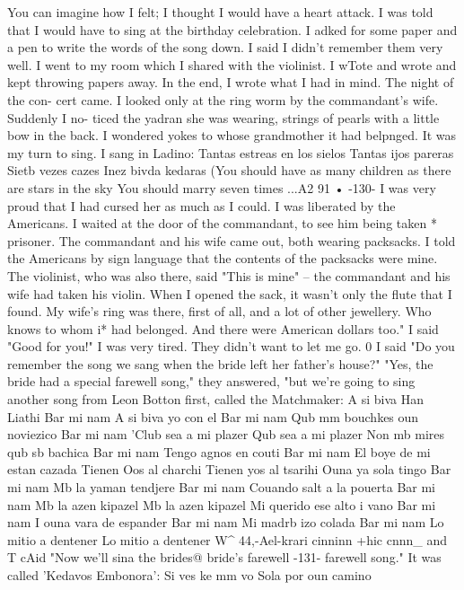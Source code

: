 You can imagine how I 
felt; I thought I would have a heart attack.
I was told that I would have to sing 
at the birthday celebration.
I adked for some paper and a pen to write the words of 
the song down.
I said I didn't remember them very well.
I went to my room which I shared with the violinist.
I wTote and wrote and kept 
throwing papers away.
In the end, I wrote what I had in mind.
The night of the con-
cert came.
I looked only at the ring worm by the commandant's wife.
Suddenly I no-
ticed the yadran she was wearing, strings of pearls with a little bow in the back.
I 
wondered yokes to whose grandmother it had belpnged.
It was my turn to sing.
I sang 
in Ladino: 
Tantas estreas en los sielos 
Tantas ijos pareras 
Sietb vezes cazes 
Inez bivda kedaras 
(You should have as many children 
as there are stars in the sky 
You should marry seven times 
...A2 91 • 
-130- 
I was very proud that I had cursed her as much as I could.
I was liberated by the Americans.
I waited at the door of the commandant, to 
see him being taken 
* 
prisoner.
The commandant and his wife came out, both wearing 
packsacks.
I told the Americans by sign language that the contents of the packsacks 
were mine.
The violinist, who was also there, said "This is mine" -- the commandant 
and his wife had taken his violin.
When I opened the sack, it wasn't only the flute 
that I found.
My wife's ring was there, first of all, and a lot of other jewellery.
Who knows to whom i* had belonged.
And there were American dollars too."
I said "Good for you!"
I was very tired.
They didn't want to let me go.
0 I 
said "Do you remember the song we sang when the bride left her father's house?"
"Yes, the bride had a special farewell song," they answered, "but we're going 
to sing another song from Leon Botton first, called the Matchmaker: 
A si biva Han Liathi 
Bar mi nam 
A si biva yo con el 
Bar mi nam 
Qub mm bouchkes oun noviezico 
Bar mi nam 
'Club sea a mi plazer 
Qub sea a mi plazer 
Non mb mires qub sb bachica 
Bar mi nam 
Tengo agnos en couti 
Bar mi nam 
El boye de mi estan cazada 
Tienen Oos al charchi 
Tienen yos al tsarihi 
Ouna ya sola tingo 
Bar mi nam 
Mb la yaman tendjere 
Bar mi nam 
Couando salt a la pouerta 
Bar mi nam 
Mb la azen kipazel 
Mb la azen kipazel 
Mi querido ese alto i vano 
Bar mi nam 
I ouna vara de espander 
Bar mi nam 
Mi madrb izo colada 
Bar mi nam 
Lo mitio a dentener 
Lo mitio a dentener 
W^ 44,-Ael-krari cinninn +hic cnnn_ and T cAid "Now we'll sina the brides@ bride's farewell 
-131- 
farewell song."
It was called 'Kedavos Embonora': 
Si ves ke mm vo 
Sola por oun camino 
